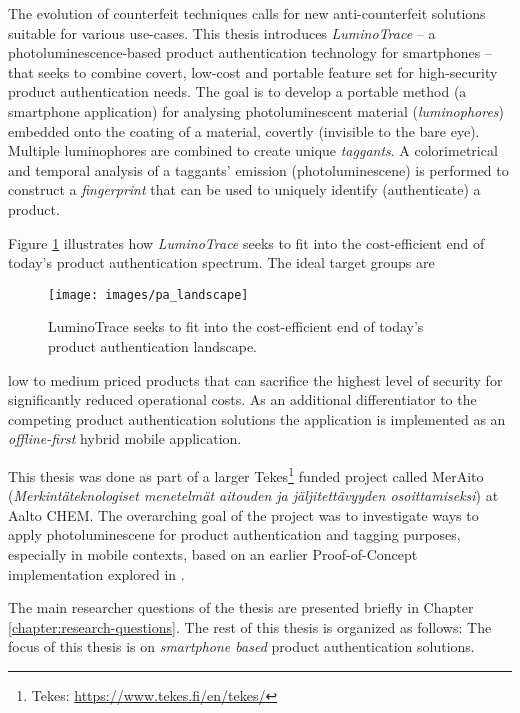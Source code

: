 \documentclass[thesis.tex]{subfiles}
\begin{document}
\enlargethispage{2\baselineskip}
The evolution of counterfeit techniques calls for new anti-counterfeit solutions suitable for various use-cases. This thesis introduces \emph{LuminoTrace} -- a photoluminescence-based product authentication technology for smartphones -- that seeks to combine covert, low-cost and portable feature set for high-security product authentication needs. The goal is to develop a portable method (a smartphone application) for analysing photoluminescent material (\emph{luminophores}) embedded onto the coating of a material, covertly (invisible to the bare eye). Multiple luminophores are combined to create unique \emph{taggants}. A colorimetrical and temporal analysis of a taggants' emission (photoluminescene) is performed to construct a \emph{fingerprint} that can be used to uniquely identify (authenticate) a product.

Figure \ref{figure:production_authentication_landscape} illustrates how \emph{LuminoTrace} seeks to fit into the cost-efficient end of today's product authentication spectrum. The ideal target groups are

\begin{figure}[h!]
\centering \texttt{[image: images/pa\_landscape]}
\vspace{-8mm}
\caption{LuminoTrace seeks to fit into the cost-efficient end of today's product authentication landscape.}
\label{figure:production_authentication_landscape}
\end{figure}

\noindent low to medium priced products that can sacrifice the highest level of security for significantly reduced operational costs. As an additional differentiator to the competing product authentication solutions the application is implemented as an \emph{offline-first} hybrid mobile application.

This thesis was done as part of a larger Tekes\footnote{Tekes: \url{https://www.tekes.fi/en/tekes/}} funded project called MerAito (\emph{Merkintäteknologiset menetelmät aitouden ja jäljitettävyyden osoittamiseksi}) at Aalto CHEM. The overarching goal of the project was to investigate ways to apply photoluminescene for product authentication and tagging purposes, especially in mobile contexts, based on an earlier Proof-of-Concept implementation explored in \cite{kuosmanen}.

The main researcher questions of the thesis are presented briefly in Chapter \ref{chapter:research-questions}. The rest of this thesis is organized as follows: The focus of this thesis is on \emph{smartphone based} product authentication solutions.
\end{document}
